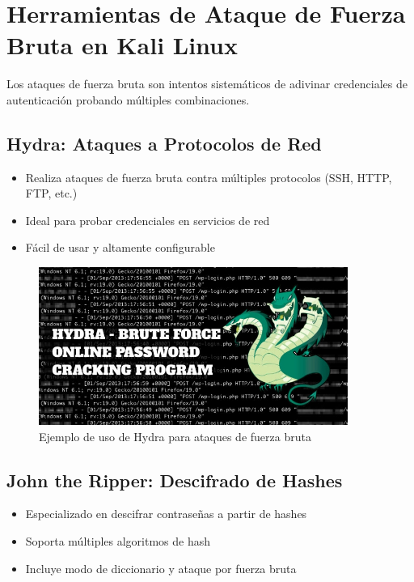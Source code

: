 \documentclass[12pt,a4paper]{article}
\begin{document}
\section{Herramientas de Ataque de Fuerza Bruta en Kali Linux}
Los ataques de fuerza bruta son intentos sistemáticos de adivinar credenciales de autenticación probando múltiples combinaciones.

\subsection{Hydra: Ataques a Protocolos de Red}
\begin{itemize}
    \item Realiza ataques de fuerza bruta contra múltiples protocolos (SSH, HTTP, FTP, etc.)
    \item Ideal para probar credenciales en servicios de red
    \item Fácil de usar y altamente configurable
\end{itemize}

\begin{figure}[H]
    \centering
    \includegraphics[width=0.9\textwidth]{hydra.png}
    \caption{Ejemplo de uso de Hydra para ataques de fuerza bruta}
    \label{fig:hydra}
\end{figure}

\subsection{John the Ripper: Descifrado de Hashes}
\begin{itemize}
    \item Especializado en descifrar contraseñas a partir de hashes
    \item Soporta múltiples algoritmos de hash
    \item Incluye modo de diccionario y ataque por fuerza bruta
\end{itemize}
\end{document}
